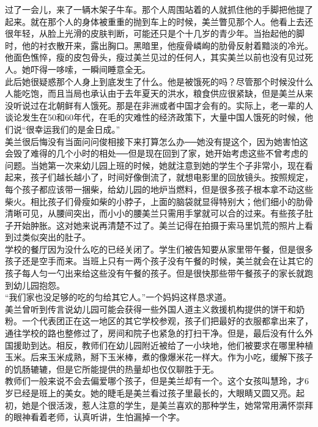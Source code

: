 过了一会儿，来了一辆木架子牛车。那个人周围站着的人就抓住他的手脚把他提了起来。就在那个人的身体被重重的抛到车上的时候，美兰瞥见那个人。他看上去还很年轻，从脸上光滑的皮肤判断，可能还只是个十几岁的青少年。当抬起他的脚时，他的衬衣散开来，露出胸口。黑暗里，他瘦骨嶙峋的肋骨反射着黯淡的冷光。他面色憔悴，瘦的皮包骨头，瘦过美兰见过的任何人，其实美兰以前也没有见过死人。她吓得一哆嗦，一瞬间睡意全无。\\

此后她很疑惑那个人身上到底发生了什么。他是被饿死的吗？尽管那个时候没什么人能吃饱，而且当局也承认由于去年夏天的洪水，粮食供应很紧缺，但是美兰从来没听说过在北朝鲜有人饿死。那是在非洲或者中国才会有的。实际上，老一辈的人谈论发生在50和60年代，在毛的灾难性的经济政策下，大量中国人饿死的时候，他们说“很幸运我们的是金日成。”\\

美兰很后悔没有当面问问俊相接下来打算怎么办──她没有提这个，因为她害怕这会毁了难得的几个小时的相处──但是现在回到了家，她开始考虑这些不曾考虑的问题。当她第一次来幼儿园上班的时候，她就注意到她的学生个子非常小，现在看起来，孩子们越长越小了，时间好像倒流了，就想电影里的回放镜头。按照规定，每个孩子都应该带一捆柴，给幼儿园的地炉当燃料，但是很多孩子根本拿不动这些柴火。相比孩子们骨瘦如柴的小脖子，上面的脑袋就显得特别大；他们细小的肋骨清晰可见，从腰间突出，而小小的腰美兰只需用手掌就可以合的过来。有些孩子肚子开始肿胀。这对她来说再清楚不过了。美兰记得在拍摄于索马里饥荒的照片上看到过类似突出的肚子。\\

学校的餐厅因为没什么吃的已经关闭了。学生们被告知要从家里带午餐，但是很多孩子还是空手而来。当班上只有一两个孩子没有午餐的时候，美兰就会在让其它的孩子每人匀一勺出来给这些没有午餐的孩子。但是很快那些带午餐孩子的家长就跑到幼儿园抱怨。\\

“我们家也没足够的吃的匀给其它人。”一个妈妈这样恳求道。\\

美兰曾听到传言说幼儿园可能会获得一些外国人道主义救援机构提供的饼干和奶粉。一个代表团正在这一地区的其它学校参观，孩子们把最好的衣服都拿出来了，通往学校的路也整修过了，房间和院子也紧急的打扫干净。但是，最后没有什么外国援助到达。相反，教师们在幼儿园附近被给了一小块地，他们被要求在哪里种植玉米。后来玉米成熟，掰下玉米棒，煮的像爆米花一样大。作为小吃，缓解下孩子的饥肠辘辘，但是它所能提供的热量却也仅仅聊胜于无。\\

教师们一般来说不会去偏爱哪个孩子，但是美兰却有一个。这个女孩叫慧玲，才6岁已经是班上的美女。她的睫毛是美兰看过孩子里最长的，大眼睛又圆又亮。起初，她是个很活泼，惹人注意的学生，是美兰喜欢的那种学生，她常常用满怀崇拜的眼神看着老师，认真听讲，生怕漏掉一个字。\\

